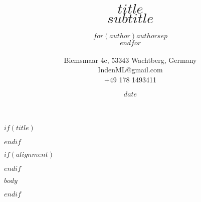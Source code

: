 \documentclass[10pt]{article}
\title{$title$ \\ $subtitle$}
\author{$for(author)$$author$$sep$\\$endfor$ \\ \\ \small Biemsmaar 4c,  53343 Wachtberg,  Germany \\ \small  IndenML@gmail.com \\ \small  +49 178 1493411}
\date{}
\date{$date$}
\begin{document}
$if(title)$
\maketitle
$endif$

% 


$if(alignment)$
\begin{$alignment$}
$endif$

$body$

\end{$alignment$}
$endif$
\end{document}
